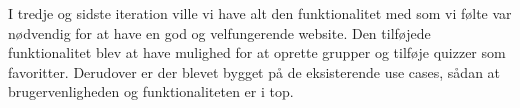I tredje og sidste iteration ville vi have alt den funktionalitet med som vi følte var nødvendig for at have en god og velfungerende website. Den tilføjede funktionalitet blev at have mulighed for at oprette grupper og tilføje quizzer som favoritter. Derudover er der blevet bygget på de eksisterende use cases, sådan at brugervenligheden og funktionaliteten er i top.








